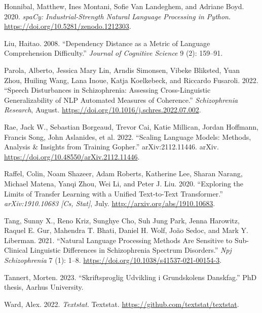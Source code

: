 \documentclass[
]{article}
\newlength{\cslhangindent}
\newlength{\cslentryspacingunit} %
\newenvironment{CSLReferences}[2] %
 {%
  \setlength{\parindent}{0pt}
  \ifodd #1
  \let\oldpar\par
  \def\par{\hangindent=\cslhangindent\oldpar}
  \fi
  \setlength{\parskip}{#2\cslentryspacingunit}
 }%
 {}
\begin{document}
\begin{CSLReferences}{1}{0}
\leavevmode{}%
Honnibal, Matthew, Ines Montani, Sofie Van Landeghem, and Adriane Boyd.
2020. \emph{{spaCy}: Industrial-Strength Natural Language Processing in
Python}. \url{https://doi.org/10.5281/zenodo.1212303}.

\leavevmode{}%
Liu, Haitao. 2008. {``Dependency Distance as a Metric of Language
Comprehension Difficulty.''} \emph{Journal of Cognitive Science} 9 (2):
159--91.

\leavevmode{}%
Parola, Alberto, Jessica Mary Lin, Arndis Simonsen, Vibeke Bliksted,
Yuan Zhou, Huiling Wang, Lana Inoue, Katja Koelkebeck, and Riccardo
Fusaroli. 2022. {``Speech Disturbances in Schizophrenia: Assessing
Cross-Linguistic Generalizability of {NLP} Automated Measures of
Coherence.''} \emph{Schizophrenia Research}, August.
\url{https://doi.org/10.1016/j.schres.2022.07.002}.

\leavevmode{}%
Rae, Jack W., Sebastian Borgeaud, Trevor Cai, Katie Millican, Jordan
Hoffmann, Francis Song, John Aslanides, et al. 2022. {``Scaling Language
Models: Methods, Analysis \& Insights from Training Gopher.''}
{arXiv}:2112.11446. {arXiv}.
\url{https://doi.org/10.48550/arXiv.2112.11446}.

\leavevmode{}%
Raffel, Colin, Noam Shazeer, Adam Roberts, Katherine Lee, Sharan Narang,
Michael Matena, Yanqi Zhou, Wei Li, and Peter J. Liu. 2020. {``Exploring
the Limits of Transfer Learning with a Unified Text-to-Text
Transformer.''} \emph{{arXiv}:1910.10683 {[}Cs, Stat{]}}, July.
\url{http://arxiv.org/abs/1910.10683}.

\leavevmode{}%
Tang, Sunny X., Reno Kriz, Sunghye Cho, Suh Jung Park, Jenna Harowitz,
Raquel E. Gur, Mahendra T. Bhati, Daniel H. Wolf, João Sedoc, and Mark
Y. Liberman. 2021. {``Natural Language Processing Methods Are Sensitive
to Sub-Clinical Linguistic Differences in Schizophrenia Spectrum
Disorders.''} \emph{Npj Schizophrenia} 7 (1): 1--8.
\url{https://doi.org/10.1038/s41537-021-00154-3}.

\leavevmode{}%
Tannert, Morten. 2023. {``Skriftsproglig Udvikling i Grundskolens
Danskfag.''} PhD thesis, Aarhus University.

\leavevmode{}%
Ward, Alex. 2022. \emph{Textstat}. Textstat.
\url{https://github.com/textstat/textstat}.

\end{CSLReferences}
\end{document}
